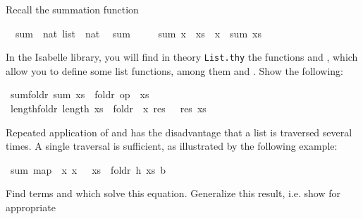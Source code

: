 %
\begin{isabellebody}%
\def\isabellecontext{a{\isadigit{2}}}%
\isamarkupfalse%
%
\isamarkuptrue%
%
\isamarkuptrue%
%
\begin{isamarkuptext}%
Recall the summation function%
\end{isamarkuptext}%
\isamarkuptrue%
\ \ sum\ {\isacharcolon}{\isacharcolon}\ {\isachardoublequote}nat\ list\ {\isasymRightarrow}\ nat{\isachardoublequote}\isanewline
\isamarkupfalse%
\isanewline
\ \ {\isachardoublequote}sum\ {\isacharbrackleft}{\isacharbrackright}\ {\isacharequal}\ {}{\isachardoublequote}\isanewline
\ \ {\isachardoublequote}sum\ {\isacharparenleft}x\ {\isacharhash}\ xs{\isacharparenright}\ {\isacharequal}\ x\ {\isacharplus}\ sum\ xs{\isachardoublequote}\isamarkupfalse%
%
\begin{isamarkuptext}%
In the Isabelle library, you will find in theory
\texttt{List.thy} the functions  and , which
allow you to define some list functions, among them  and
. Show the following:%
\end{isamarkuptext}%
\isamarkuptrue%
\ sum{\isacharunderscore}foldr{\isacharcolon}\ {\isachardoublequote}sum\ xs\ {\isacharequal}\ foldr\ {\isacharparenleft}op\ {\isacharplus}{\isacharparenright}\ xs\ {}{\isachardoublequote}\isamarkupfalse%
\isanewline
\isamarkupfalse%
\ length{\isacharunderscore}foldr{\isacharcolon}\ {\isachardoublequote}length\ xs\ {\isacharequal}\ foldr\ {\isacharparenleft}{\isasymlambda}\ x\ res{\isachardot}\ {}\ {\isacharplus}\ res{\isacharparenright}\ xs\ {}{\isachardoublequote}\isamarkupfalse%
\isamarkupfalse%
%
\begin{isamarkuptext}%
Repeated application of  and  has the
disadvantage that a list is traversed several times. A single traversal is sufficient, as
illustrated by the following example:%
\end{isamarkuptext}%
\isamarkuptrue%
\ {\isachardoublequote}sum\ {\isacharparenleft}map\ {\isacharparenleft}{\isasymlambda}\ x{\isachardot}\ x\ {\isacharplus}\ {}{\isacharparenright}\ xs{\isacharparenright}\ {\isacharequal}\ foldr\ h\ xs\ b{\isachardoublequote}\isamarkupfalse%
\isamarkupfalse%
%
\begin{isamarkuptext}%
Find terms  and  which solve this
equation. Generalize this result, i.e. show for appropriate 

\end{isamarkuptext}
\end{isabellebody}
